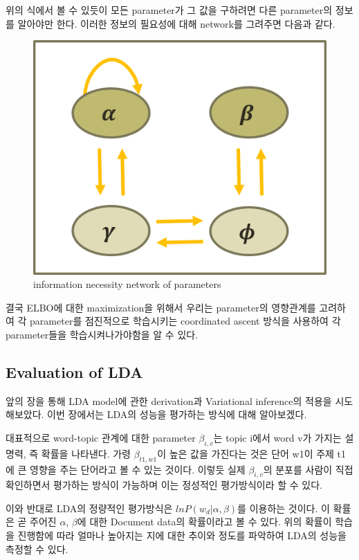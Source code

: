 \documentclass[draft=false]{oblivoir}
\begin{document}
위의 식에서 볼 수 있듯이 모든 parameter가 그 값을 구하려면 다른 parameter의 정보를 알아야만 한다. 이러한 정보의 필요성에 대해 network를 그려주면 다음과 같다.

\begin{figure}[ht] \centering 
\includegraphics[scale=0.8]{fig11_13.png} 
\caption{information necessity network of parameters}
\label{fig:11-15}
\end{figure}

결국 ELBO에 대한 maximization을 위해서 우리는 parameter의 영향관계를 고려하여 각 parameter를 점진적으로 학습시키는 coordinated ascent 방식을 사용하여 각 parameter들을 학습시켜나가야함을 알 수 있다.


\subsection{Evaluation of LDA}
앞의 장을 통해 LDA model에 관한 derivation과 Variational inference의 적용을 시도해보았다. 이번 장에서는 LDA의 성능을 평가하는 방식에 대해 알아보겠다. 

대표적으로 word-topic 관계에 대한 parameter $\beta_{i,v}$는 topic i에서 word v가 가지는 설명력, 즉 확률을 나타낸다. 가령 $\beta_{t1,w1}$이 높은 값을 가진다는 것은 단어 w1이 주제 t1에 큰 영향을 주는 단어라고 볼 수 있는 것이다. 이렇듯 실제 $\beta_{i,v}$의 분포를 사람이 직접 확인하면서 평가하는 방식이 가능하며 이는 정성적인 평가방식이라 할 수 있다. 

이와 반대로 LDA의 정량적인 평가방식은 $lnP(w_{d}|\alpha,\beta)$를 이용하는 것이다. 이 확률은 곧 주어진 $\alpha$, $\beta$에 대한 Document data의 확률이라고 볼 수 있다. 위의 확률이 학습을 진행함에 따라 얼마나 높아지는 지에 대한 추이와 정도를 파악하여 LDA의 성능을 측정할 수 있다.
\end{document}
